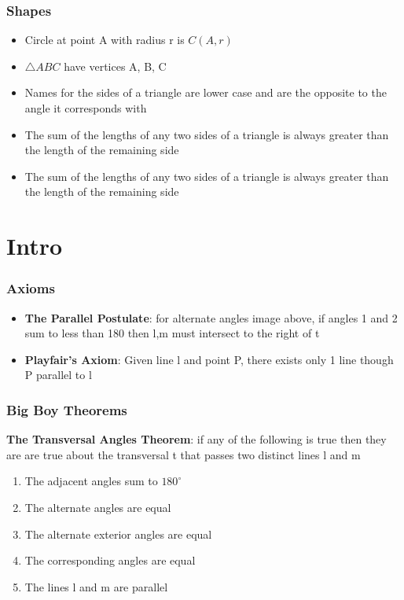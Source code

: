 \documentclass[11pt]{article}
\begin{document}
\subsubsection{Shapes}
\begin{itemize}
  \item Circle at point A with radius r is $C(A,r)$
  \item $\triangle ABC$ have vertices A, B, C 
  \item Names for the sides of a triangle are lower case and are the opposite to the angle it corresponds with
  \item The sum of the lengths of any two sides of a triangle is always greater than the length of the remaining side
  \item The sum of the lengths of any two sides of a triangle is always greater than the length of the remaining side
\end{itemize}

\section{Intro}
\subsubsection{Axioms}
\begin{itemize}
  \item \textbf{The Parallel Postulate}: for alternate angles image above, if angles 1 and 2 sum to less than 180 then l,m must intersect to the right of t 
  \item \textbf{Playfair's Axiom}: Given line l and point P, there exists only 1 line though P parallel to l
\end{itemize}
\subsubsection{Big Boy Theorems}
\textbf{The Transversal Angles Theorem}: if any of the following is true then they are are true about the transversal t that passes two distinct lines l and m
\begin{enumerate}
    \item The adjacent angles sum to $180^{\circ}$
    \item The alternate angles are equal
    \item The alternate exterior angles are equal
    \item The corresponding angles are equal
    \item The lines l and m are parallel
\end{enumerate}
\end{document}
